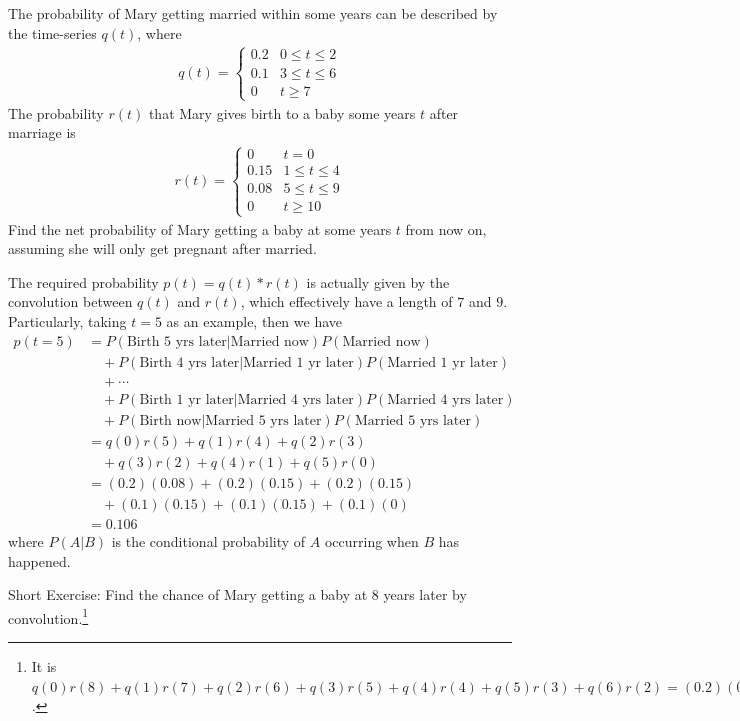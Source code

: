\begin{exmp}
The probability of Mary getting married within some years can be described by the time-series $q(t)$, where
\begin{align*}
q(t) = 
\begin{cases}
0.2 & 0 \leq t \leq 2 \\
0.1 & 3 \leq t \leq 6 \\
0 & t \geq 7
\end{cases}
\end{align*}
The probability $r(t)$ that Mary gives birth to a baby some years $t$ after marriage is
\begin{align*}
r(t) = 
\begin{cases}
0 & t = 0 \\
0.15 & 1 \leq t \leq 4 \\
0.08 & 5 \leq t \leq 9 \\
0 & t \geq 10
\end{cases}    
\end{align*}
Find the net probability of Mary getting a baby at some years $t$ from now on, assuming she will only get pregnant after married. 
\end{exmp}
\begin{solution}
The required probability $p(t) = q(t) * r(t)$ is actually given by the convolution between $q(t)$ and $r(t)$, which effectively have a length of $7$ and $9$. Particularly, taking $t = 5$ as an example, then we have
\begin{align*}
p(t = 5) &= P(\text{Birth 5 yrs later}|\text{Married now})P(\text{Married now}) \\
&\quad+ P(\text{Birth 4 yrs later}|\text{Married 1 yr later})P(\text{Married 1 yr later})\\
&\quad+ \cdots \\
&\quad+ P(\text{Birth 1 yr later}|\text{Married 4 yrs later})P(\text{Married 4 yrs later}) \\
&\quad+ P(\text{Birth now}|\text{Married 5 yrs later})P(\text{Married 5 yrs later}) \\
&= q(0)r(5) + q(1)r(4) + q(2)r(3) \\
&\quad + q(3)r(2) + q(4)r(1) + q(5)r(0) \\
&= (0.2)(0.08) + (0.2)(0.15) + (0.2)(0.15) \\
&\quad + (0.1)(0.15) + (0.1)(0.15) + (0.1)(0) \\
&= 0.106
\end{align*}
where $P(A|B)$ is the conditional probability of $A$ occurring when $B$ has happened.
\end{solution}
Short Exercise: Find the chance of Mary getting a baby at $8$ years later by convolution.\footnote{It is $q(0)r(8) + q(1)r(7) + q(2)r(6) + q(3)r(5) + q(4)r(4) + q(5)r(3) + q(6)r(2) = (0.2)(0.08) + (0.2)(0.08) + (0.2)(0.08) + (0.1)(0.08) + (0.1)(0.15) + (0.1)(0.15) + (0.1)(0.15) = 0.101$.}\par

